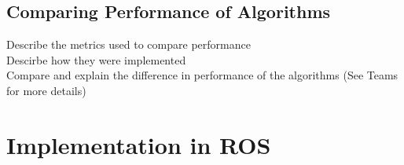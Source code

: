 \documentclass[a4paper,12pt]{article}
\begin{document}
			\subsection{Comparing Performance of Algorithms}

		Describe the metrics used to compare performance \\
		Descirbe how they were implemented \\
		Compare and explain the difference in performance of the algorithms (See Teams for more details)


	\section{Implementation in ROS}
	
\end{document}
